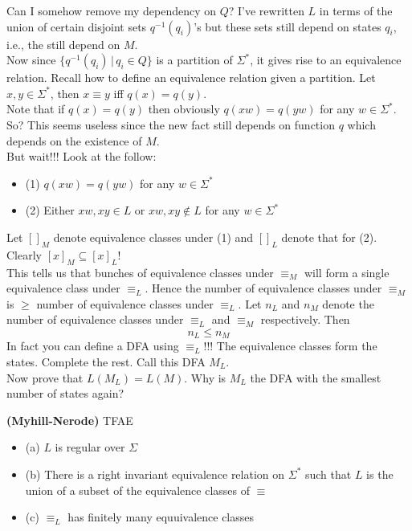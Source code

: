 Can I somehow remove my dependency on $Q$? I've rewritten $L$ in
terms of the union of certain disjoint sets $q^{-1}(q_i)$'s but
these sets still depend on states $q_i$, i.e., the still depend on
$M$.
\\

Now since $\{q^{-1}(q_i) \,|\, q_i \in Q\}$ is a partition of
$\Sigma^*$, it gives rise to an equivalence relation. Recall how
to define an equivalence relation given a partition. Let $x,y \in
\Sigma^*$, then $x \equiv y$ iff $q(x)=q(y)$.
\\

Note that if $q(x) = q(y)$ then obviously $q(xw) = q(yw)$ for any
$w \in \Sigma^*$. So? This seems useless since the new fact still
depends on function $q$ which depends on the existence of $M$.
\\
But wait!!! Look at the follow:
\begin{itemize}
 \item{(1)} $q(xw) = q(yw)$ for any $w \in \Sigma^*$
 \item{(2)} Either $xw, xy \in L$ or $xw,xy \notin L$ for any $w \in \Sigma^*$
\end{itemize}
Let $[]_M$ denote equivalence classes under (1) and $[]_L$ denote
that for (2). Clearly $[x]_M \subseteq [x]_L$!
\\
This tells us that bunches of equivalence classes under $\equiv_M$
will form a single equivalence class under $\equiv_L$. Hence the
number of equivalence classes under $\equiv_M$ is $\geq$ number of
equivalence classes under $\equiv_L$. Let $n_L$ and $n_M$ denote
the number of equivalence classes under $\equiv_L$ and $\equiv_M$
respectively. Then
\[
    n_L \leq n_M
\]
In fact you can define a DFA using $\equiv_L$!!! The equivalence
classes form the states. Complete the rest. Call this DFA $M_L$.
\\
Now prove that $L(M_L) = L(M)$. Why is $M_L$ the DFA with the
smallest number of states again?

\begin{thm}\label{T:myhillnerode} {\bf(Myhill-Nerode)}
 TFAE
 \begin{itemize}
  \item{\textup{(a)}} $L$ is regular over $\Sigma$
  \item{\textup{(b)}} There is a right invariant equivalence
  relation on $\Sigma^*$ such that $L$ is the union of a subset of
  the equivalence classes of $\equiv$
  \item{\textup{(c)}} $\equiv_L$ has finitely many equuivalence
  classes
 \end{itemize}
\end{thm}


